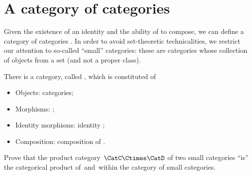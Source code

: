 \section{A category of categories}

Given the existence of an identity  and the ability of  to compose, we can define a category of categories \Category.
In order to avoid set-theoretic technicalities, we restrict our attention to so-called ``small'' categories: these are categories whose collection of objects from a set (and not a proper class).

\begin{ctdefinition}
    \label{def:Category}
    There is a category, called \Category, which is constituted of
    \begin{itemize}
        \item Objects: categories;
        \item Morphisms: ;
        \item Identity morphisms: identity ;
        \item Composition: composition of .
    \end{itemize}
\end{ctdefinition}
\vfill
\begin{gradedexercise}
    Prove that the product category~$\CatC \Ctimes \CatD$ of two small categories ``is'' the categorical product of~\CatC and~\CatD within the category of small categories.
\end{gradedexercise}
